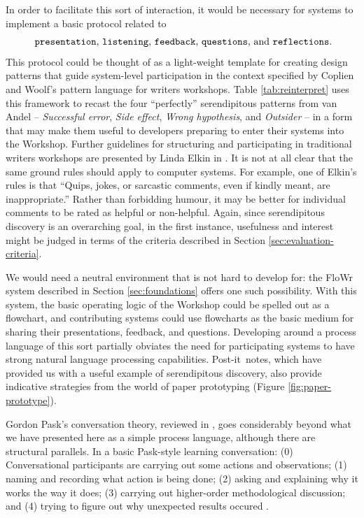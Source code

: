 \documentclass{llncs}
\begin{document}
In order to facilitate this sort of interaction, it would be necessary
for systems to implement a basic protocol related to
\[
\text{
{\tt presentation}, {\tt listening}, {\tt
  feedback}, {\tt questions}, and {\tt
  reflections}.}
\]
This protocol could be thought of as a light-weight template for
creating design patterns that guide system-level participation in the
context specified by Coplien and Woolf's pattern language for writers
workshops.  Table \ref{tab:reinterpret} uses this framework to recast
the four ``perfectly'' serendipitous patterns from van Andel --
\emph{Successful error}, \emph{Side effect}, \emph{Wrong hypothesis},
and \emph{Outsider} -- in a form that may make them useful to
developers preparing to enter their systems into the Workshop.
%
Further guidelines for structuring and participating in traditional
writers workshops are presented by Linda Elkin in
\cite[pp. 201-203]{gabriel2002writer}.  It is not at all clear that
the same ground rules should apply to computer systems.  For example,
one of Elkin's rules is that ``Quips, jokes, or sarcastic comments,
even if kindly meant, are inappropriate.''  Rather than forbidding
humour, it may be better for individual comments to be rated as
helpful or non-helpful.  Again, since serendipitous discovery is an
overarching goal, in the first instance, usefulness and interest might
be judged in terms of the criteria described in Section
\ref{sec:evaluation-criteria}.

We would need a neutral environment that is not hard to develop for:
the {\sf FloWr} system described in Section \ref{sec:foundations}
offers one such possibility.  With this system, the basic operating
logic of the Workshop could be spelled out as a flowchart, and
contributing systems could use flowcharts as the basic medium for
sharing their presentations, feedback, and questions.  Developing
around a process language of this sort partially obviates the need for
participating systems to have strong natural language processing
capabilities.  
%
Post-it\texttrademark\ notes, which have provided us with a useful
example of serendipitous discovery, also provide indicative strategies
from the world of paper prototyping (Figure \ref{fig:paper-prototype}).

Gordon Pask's conversation theory, reviewed in
\cite{conversation-theory-review,boyd2004conversation}, goes
considerably beyond what we have presented here as a simple process
language, although there are structural parallels.  In a basic
Pask-style learning conversation: (0) Conversational participants are
carrying out some actions and observations; (1) naming and recording
what action is being done; (2) asking and explaining why it works the
way it does; (3) carrying out higher-order methodological discussion;
and (4) trying to figure out why unexpected results occured \cite[p. 190]{boyd2004conversation}.
\end{document}
